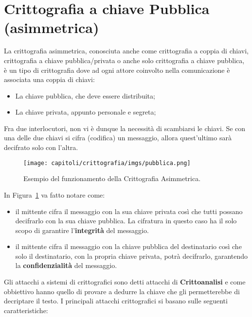 \section[Crittografia a chiave Pubblica (asimmetrica)]{Crittografia a chiave Pubblica \\(asimmetrica)}

La crittografia asimmetrica, conosciuta anche come crittografia a coppia di chiavi,
crittografia a
chiave pubblica/privata o anche solo crittografia a chiave pubblica, è un tipo
di crittografia dove ad
ogni attore coinvolto nella comunicazione è associata una coppia di chiavi:

\begin{itemize}
    \item La chiave pubblica, che deve essere distribuita;
    \item La chiave privata, appunto personale e segreta;
\end{itemize}

Fra due interlocutori, non vi è dunque la necessità di scambiarsi le chiavi.
Se con una delle due
chiavi si cifra (codifica) un messaggio, allora quest'ultimo sarà decifrato solo
con l'altra.

\begin{figure}[H]
    \centering
    \texttt{[image: capitoli/crittografia/imgs/pubblica.png]}
    \caption{Esempio del funzionamento della Crittografia Asimmetrica.}
    \label{fig:crittografia_asimmetrica}
\end{figure}

\newpage

In Figura~\ref{fig:crittografia_asimmetrica} va fatto notare come:
\begin{itemize}
	\item il mittente cifra il messaggio con la sua chiave privata così che tutti possano decifrarlo con la sua chiave pubblica. La cifratura in questo caso ha il solo scopo di garantire l'\textbf{integrità} del messaggio.
	\item il mittente cifra il messaggio con la chiave pubblica del destinatario così che solo il destinatario, con la propria chiave privata, potrà decifrarlo, garantendo la \textbf{confidenzialità} del messaggio.
\end{itemize}

Gli attacchi a sistemi di crittografici sono detti attacchi
di \textbf{Crittoanalisi} e
come obbiettivo hanno quello di provare a dedurre la chiave che gli
permetterebbe di decriptare il testo.
I principali attacchi crittografici si basano sulle seguenti caratteristiche:

